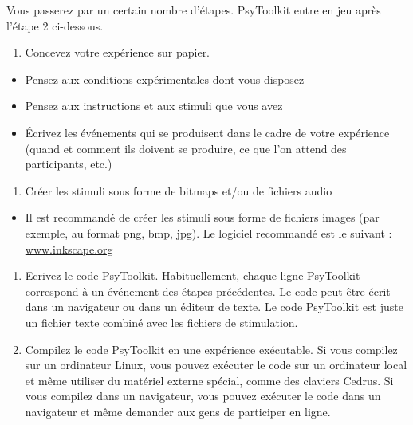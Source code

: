 \documentclass[
]{book}
\providecommand{\tightlist}{%
  \setlength{\itemsep}{0pt}\setlength{\parskip}{0pt}}
\begin{document}
Vous passerez par un certain nombre d'étapes. PsyToolkit entre en jeu après l'étape 2 ci-dessous.

\begin{enumerate}
\def\labelenumi{\arabic{enumi}.}
\tightlist
\item
  Concevez votre expérience sur papier.
\end{enumerate}

\begin{itemize}
\tightlist
\item
  Pensez aux conditions expérimentales dont vous disposez
\item
  Pensez aux instructions et aux stimuli que vous avez
\item
  Écrivez les événements qui se produisent dans le cadre de votre expérience (quand et comment ils doivent se produire, ce que l'on attend des participants, etc.)
\end{itemize}

\begin{enumerate}
\def\labelenumi{\arabic{enumi}.}
\setcounter{enumi}{1}
\tightlist
\item
  Créer les stimuli sous forme de bitmaps et/ou de fichiers audio
\end{enumerate}

\begin{itemize}
\tightlist
\item
  Il est recommandé de créer les stimuli sous forme de fichiers images (par exemple, au format png, bmp, jpg). Le logiciel recommandé est le suivant : \url{www.inkscape.org}
\end{itemize}

\begin{enumerate}
\def\labelenumi{\arabic{enumi}.}
\setcounter{enumi}{2}
\item
  Ecrivez le code PsyToolkit. Habituellement, chaque ligne PsyToolkit correspond à un événement des étapes précédentes. Le code peut être écrit dans un navigateur ou dans un éditeur de texte. Le code PsyToolkit est juste un fichier texte combiné avec les fichiers de stimulation.
\item
  Compilez le code PsyToolkit en une expérience exécutable. Si vous compilez sur un ordinateur Linux, vous pouvez exécuter le code sur un ordinateur local et même utiliser du matériel externe spécial, comme des claviers Cedrus. Si vous compilez dans un navigateur, vous pouvez exécuter le code dans un navigateur et même demander aux gens de participer en ligne.
\end{enumerate}
\end{document}
